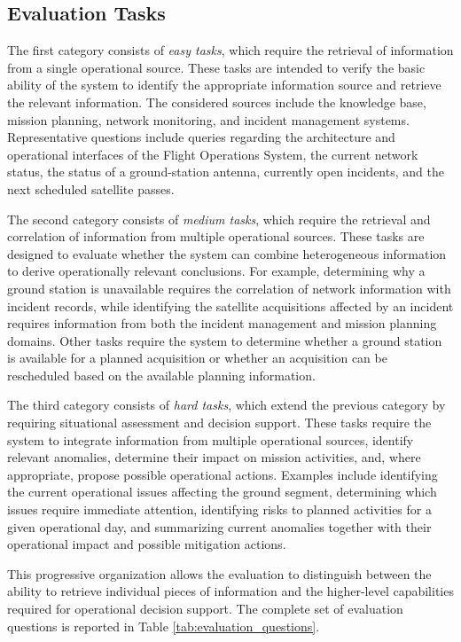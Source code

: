 \subsection{Evaluation Tasks}
\label{subsec: eval_task}

The first category consists of \textit{easy tasks}, which require the retrieval of information from a single operational source. These tasks are intended to verify the basic ability of the system to identify the appropriate information source and retrieve the relevant information. The considered sources include the knowledge base, mission planning, network monitoring, and incident management systems. Representative questions include queries regarding the architecture and operational interfaces of the Flight Operations System, the current network status, the status of a ground-station antenna, currently open incidents, and the next scheduled satellite passes.

The second category consists of \textit{medium tasks}, which require the retrieval and correlation of information from multiple operational sources. These tasks are designed to evaluate whether the system can combine heterogeneous information to derive operationally relevant conclusions. For example, determining why a ground station is unavailable requires the correlation of network information with incident records, while identifying the satellite acquisitions affected by an incident requires information from both the incident management and mission planning domains. Other tasks require the system to determine whether a ground station is available for a planned acquisition or whether an acquisition can be rescheduled based on the available planning information.

The third category consists of \textit{hard tasks}, which extend the previous category by requiring situational assessment and decision support. These tasks require the system to integrate information from multiple operational sources, identify relevant anomalies, determine their impact on mission activities, and, where appropriate, propose possible operational actions. Examples include identifying the current operational issues affecting the ground segment, determining which issues require immediate attention, identifying risks to planned activities for a given operational day, and summarizing current anomalies together with their operational impact and possible mitigation actions.

This progressive organization allows the evaluation to distinguish between the ability to retrieve individual pieces of information and the higher-level capabilities required for operational decision support. The complete set of evaluation questions is reported in Table \ref{tab:evaluation_questions}.

